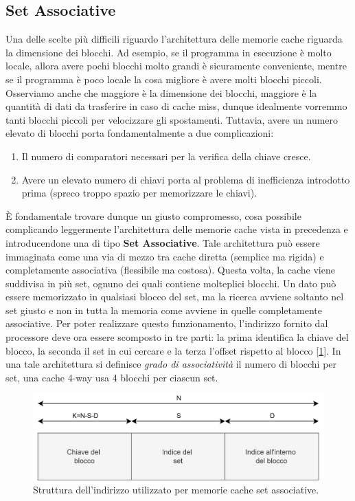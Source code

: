 \subsection{Set Associative}
\label{chap:set-ass}
Una delle scelte più difficili riguardo l'architettura delle memorie cache riguarda la dimensione dei blocchi. Ad esempio, se il programma in esecuzione è molto locale, allora avere pochi blocchi molto grandi è sicuramente conveniente, mentre se il programma è poco locale la cosa migliore è avere molti blocchi piccoli. Osserviamo anche che maggiore è la dimensione dei blocchi, maggiore è la quantità di dati da trasferire in caso di cache miss, dunque idealmente vorremmo tanti blocchi piccoli per velocizzare gli spostamenti. Tuttavia, avere un numero elevato di blocchi porta fondamentalmente a due complicazioni:
\begin{enumerate}
    \item Il numero di comparatori necessari per la verifica della chiave cresce.
    \item Avere un elevato numero di chiavi porta al problema di inefficienza introdotto prima (spreco troppo spazio per memorizzare le chiavi).
\end{enumerate}

\MakeUppercase{è} fondamentale trovare dunque un giusto compromesso, cosa possibile complicando leggermente l'architettura delle memorie cache vista in precedenza e introducendone una di tipo \textbf{Set Associative}. Tale architettura può essere immaginata come una via di mezzo tra cache diretta (semplice ma rigida) e completamente associativa (flessibile ma costosa). Questa volta, la cache viene suddivisa in più set, ognuno dei quali contiene molteplici blocchi. Un dato può essere memorizzato in qualsiasi blocco del set, ma la ricerca avviene soltanto nel set giusto e non in tutta la memoria come avviene in quelle completamente associative. Per poter realizzare questo funzionamento, l'indirizzo fornito dal processore deve ora essere scomposto in tre parti: la prima identifica la chiave del blocco, la seconda il set in cui cercare e la terza l'offset rispetto al blocco [\ref{fig:indirizzo-setass}]. In una tale architettura si definisce \textit{grado di associatività} il numero di blocchi per set, una cache 4-way usa 4 blocchi per ciascun set.

\begin{figure}[!h]
    \centering
    \includegraphics[width=0.6\linewidth]{img/indirizzo-setass.png}
    \caption{Struttura dell'indirizzo utilizzato per memorie cache set associative.}
    \label{fig:indirizzo-setass}
\end{figure}

